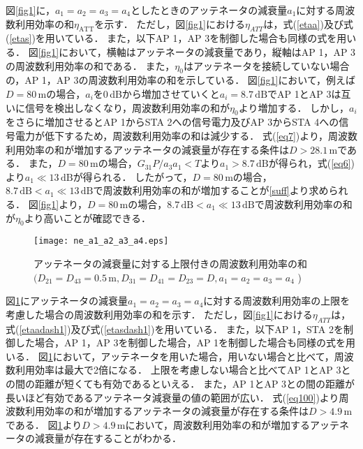 \documentclass[master]{kuisthesis}		%
\begin{document}
図\ref{fig1}に，$a_1=a_2=a_3=a_4$としたときのアッテネータの減衰量$a_1$に対する周波数利用効率の和$\eta_\mathrm{ATT}$を示す．
ただし，図\ref{fig1}における$\eta_{ATT}$は，式(\ref{etaa})及び式(\ref{etas})を用いている．
また，以下AP 1，AP 3を制御した場合も同様の式を用いる．
図\ref{fig1}において，横軸はアッテネータの減衰量であり，縦軸はAP 1，AP 3の周波数利用効率の和である．
また，$\eta_0$はアッテネータを接続していない場合の，AP 1，AP 3の周波数利用効率の和を示している．
図\ref{fig1}において，例えば$D=80\,\mathrm{m}$の場合，$a_i$を0\,dBから増加させていくと$a_i = 8.7\,\mathrm{dB}$でAP 1とAP 3は互いに信号を検出しなくなり，周波数利用効率の和が$\eta_0$より増加する．
しかし，$a_i$をさらに増加させるとAP 1からSTA 2への信号電力及びAP 3からSTA 4への信号電力が低下するため，周波数利用効率の和は減少する．
式(\ref{eq7})より，周波数利用効率の和が増加するアッテネータの減衰量が存在する条件は$D > 28.1\,\mathrm{m}$である．
また，$D=80\,\mathrm{m}$の場合，$G_{31}P/a_3a_1<T$より$a_1>8.7\,\mathrm{dB}$が得られ，式(\ref{eq6})より$a_1 \ll 13\,\mathrm{dB}$が得られる．
したがって，$D=80\,\mathrm{m}$の場合，$8.7\,\mathrm{dB} < a_1 \ll 13\,\mathrm{dB}$で周波数利用効率の和が増加することが\ref{suff}より求められる．
図\ref{fig1}より，$D=80\,\mathrm{m}$の場合，$8.7\,\mathrm{dB} < a_1 \ll 13\,\mathrm{dB}$で周波数利用効率の和が$\eta_0$より高いことが確認できる．
\ifnum {}
\begin{figure}[!t]
\centering
\texttt{[image: ne\_a1\_a2\_a3\_a4.eps]}
\caption{アッテネータの減衰量に対する上限付きの周波数利用効率の和   \newline $(D_{21}=D_{43}=0.5\,\mathrm{m},D_{31}=D_{41}=D_{23}=D,a_1=a_2=a_3=a_4$ )}
\label{n_e_a1_a2_a3_a4}
\end{figure}
\fi

図\ref{n_e_a1_a2_a3_a4}にアッテネータの減衰量$a_1=a_2=a_3=a_4$に対する周波数利用効率の上限を考慮した場合の周波数利用効率の和を示す．
ただし，図\ref{fig1}における$\eta_{ATT}$は，式(\ref{etaadash1})及び式(\ref{etasdash1})を用いている．
また，以下AP 1，STA 2を制御した場合，AP 1，AP 3を制御した場合，AP 1を制御した場合も同様の式を用いる．
図\ref{n_e_a1_a2_a3_a4}において，アッテネータを用いた場合，用いない場合と比べて，周波数利用効率は最大で2倍になる．
上限を考慮しない場合と比べてAP 1とAP 3との間の距離が短くても有効であるといえる．
また，AP 1とAP 3との間の距離が長いほど有効であるアッテネータ減衰量の値の範囲が広い．
式(\ref{eq100})より周波数利用効率の和が増加するアッテネータの減衰量が存在する条件は$D > 4.9\,\mathrm{m}$である．
図\ref{n_e_a1_a2_a3_a4}より$D > 4.9\,\mathrm{m}$において，周波数利用効率の和が増加するアッテネータの減衰量が存在することがわかる．
\end{document}
